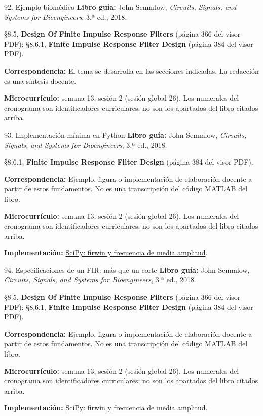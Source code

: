 \documentclass[
  10pt,
  ignorenonframetext,
  aspectratio=169,
  spanish,
]{beamer}
\begin{document}
\begin{frame}{92. Ejemplo biomédico}
\label{ejemplo-biomuxe9dico-5}
\textbf{Libro guía:} John Semmlow, \emph{Circuits, Signals, and Systems
for Bioengineers}, 3.ª ed., 2018.

§8.5, \textbf{Design Of Finite Impulse Response Filters} (página 366 del
visor PDF); §8.6.1, \textbf{Finite Impulse Response Filter Design}
(página 384 del visor PDF).

\textbf{Correspondencia:} El tema se desarrolla en las secciones
indicadas. La redacción es una síntesis docente.

\textbf{Microcurrículo:} semana 13, sesión 2 (sesión global 26). Los
numerales del cronograma son identificadores curriculares; no son los
apartados del libro citados arriba.
\end{frame}

\begin{frame}{93. Implementación mínima en Python}
\label{implementaciuxf3n-muxednima-en-python-5}
\textbf{Libro guía:} John Semmlow, \emph{Circuits, Signals, and Systems
for Bioengineers}, 3.ª ed., 2018.

§8.6.1, \textbf{Finite Impulse Response Filter Design} (página 384 del
visor PDF).

\textbf{Correspondencia:} Ejemplo, figura o implementación de
elaboración docente a partir de estos fundamentos. No es una
transcripción del código MATLAB del libro.

\textbf{Microcurrículo:} semana 13, sesión 2 (sesión global 26). Los
numerales del cronograma son identificadores curriculares; no son los
apartados del libro citados arriba.

\textbf{Implementación:}
\href{https://docs.scipy.org/doc/scipy/reference/generated/scipy.signal.firwin.html}{SciPy:
firwin y frecuencia de media amplitud}.
\end{frame}

\begin{frame}{94. Especificaciones de un FIR: más que un corte}
\label{especificaciones-de-un-fir-muxe1s-que-un-corte}
\textbf{Libro guía:} John Semmlow, \emph{Circuits, Signals, and Systems
for Bioengineers}, 3.ª ed., 2018.

§8.5, \textbf{Design Of Finite Impulse Response Filters} (página 366 del
visor PDF); §8.6.1, \textbf{Finite Impulse Response Filter Design}
(página 384 del visor PDF).

\textbf{Correspondencia:} Ejemplo, figura o implementación de
elaboración docente a partir de estos fundamentos. No es una
transcripción del código MATLAB del libro.

\textbf{Microcurrículo:} semana 13, sesión 2 (sesión global 26). Los
numerales del cronograma son identificadores curriculares; no son los
apartados del libro citados arriba.

\textbf{Implementación:}
\href{https://docs.scipy.org/doc/scipy/reference/generated/scipy.signal.firwin.html}{SciPy:
firwin y frecuencia de media amplitud}.
\end{frame}
\end{document}
